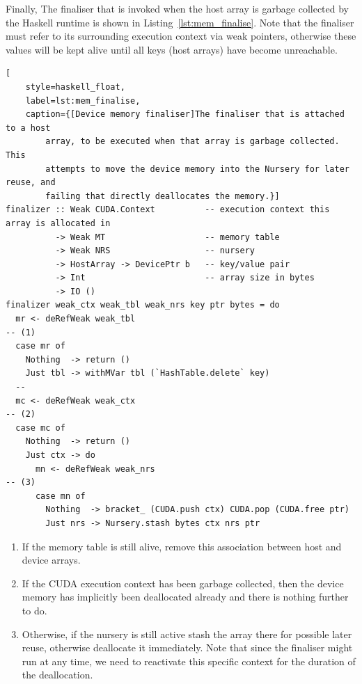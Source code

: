 Finally, The finaliser that is invoked when the host array is garbage
collected by the Haskell runtime is shown in Listing~\ref{lst:mem_finalise}.
Note that the finaliser must refer to its surrounding execution context via weak
pointers, otherwise these values will be kept alive until all keys (host arrays)
have become unreachable.
%
\begin{lstlisting}[
    style=haskell_float,
    label=lst:mem_finalise,
    caption={[Device memory finaliser]The finaliser that is attached to a host
        array, to be executed when that array is garbage collected. This
        attempts to move the device memory into the Nursery for later reuse, and
        failing that directly deallocates the memory.}]
finalizer :: Weak CUDA.Context          -- execution context this array is allocated in
          -> Weak MT                    -- memory table
          -> Weak NRS                   -- nursery
          -> HostArray -> DevicePtr b   -- key/value pair
          -> Int                        -- array size in bytes
          -> IO ()
finalizer weak_ctx weak_tbl weak_nrs key ptr bytes = do
  mr <- deRefWeak weak_tbl                                                             -- (1)
  case mr of
    Nothing  -> return ()
    Just tbl -> withMVar tbl (`HashTable.delete` key)
  --
  mc <- deRefWeak weak_ctx                                                             -- (2)
  case mc of
    Nothing  -> return ()
    Just ctx -> do
      mn <- deRefWeak weak_nrs                                                         -- (3)
      case mn of
        Nothing  -> bracket_ (CUDA.push ctx) CUDA.pop (CUDA.free ptr)
        Just nrs -> Nursery.stash bytes ctx nrs ptr
\end{lstlisting}
%
\begin{enumerate}
\item If the memory table is still alive, remove this association between host
    and device arrays.

\item If the CUDA execution context has been garbage collected, then the
    device memory has implicitly been deallocated already and there is nothing
    further to do.

\item Otherwise, if the nursery is still active stash the array there for
    possible later reuse, otherwise deallocate it immediately. Note that since
    the finaliser might run at any time, we need to reactivate this specific
    context for the duration of the deallocation.
\end{enumerate}


